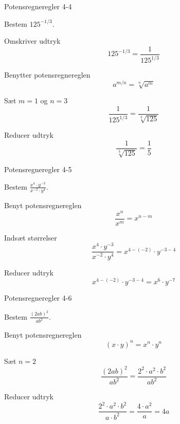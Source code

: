 \documentclass{article}
\begin{document}
\begin{exercise}{Potensregneregler 4-4}

Bestem $125^{-1/3}$.


\hint

Omskriver udtryk
\[
125^{-1/3} = \frac{1}{125^{1/3}}
\]

\hint

Benytter potensregnereglen
\[
a^{m/n} = \sqrt[n]{a^m}
\]

\hint

Sæt $m=1$ og $n=3$
\[
\frac{1}{125^{1/3}} = \frac{1}{\sqrt[3]{125}}
\]

\hint

Reducer udtryk
\[
 \frac{1}{\sqrt[3]{125}} = \frac{1}{5}
\]


\end{exercise}

\newpage

\begin{exercise}{Potensregneregler 4-5}

Bestem $\frac{x^4 \cdot y^{-3}}{x^{-2} \cdot y^{4}}$.


\hint

Benyt potensregnereglen
\[
\frac{x^n}{x^m} = x^{n - m}
\]

\hint

Indsæt størrelser
\[
\frac{x^4 \cdot y^{-3}}{x^{-2} \cdot y^{4}} = x^{4-(-2)} \cdot y^{-3 - 4}
\]

\hint

Reducer udtryk
\[
x^{4-(-2)} \cdot y^{-3 - 4} = x^6 \cdot y^{-7}
\]


\end{exercise}

\newpage

\begin{exercise}{Potensregneregler 4-6}

Bestem $\frac{(2ab)^2}{ab^2}$.


\hint

Benyt potensregnereglen
\[
(x\cdot y)^n = x^n \cdot y^n
\]

\hint

Sæt $n=2$
\[
\frac{(2ab)^2}{ab^2} = \frac{2^2 \cdot a^2 \cdot b^2}{ab^2}
\]

\hint

Reducer udtryk
\[
\frac{2^2 \cdot a^2 \cdot b^2}{a \cdot b^2} = \frac{4 \cdot a^2}{a} = 4a
\]


\end{exercise}
\end{document}
